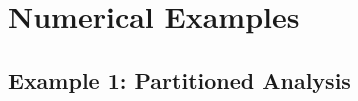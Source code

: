 \documentclass{aiaa-tc}
\renewcommand{\vec}[1]{\underline{#1}}
\begin{document}
 
 
\section{Numerical Examples}
 
\subsection{Example 1: Partitioned Analysis}
\end{document}
